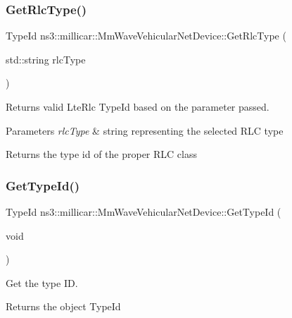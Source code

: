 \subsubsection{\texorpdfstring{Get\+Rlc\+Type()}{GetRlcType()}}
{\footnotesize\ttfamily Type\+Id ns3\+::millicar\+::\+Mm\+Wave\+Vehicular\+Net\+Device\+::\+Get\+Rlc\+Type (\begin{DoxyParamCaption}\item[{std\+::string}]{rlc\+Type }\end{DoxyParamCaption})}



Returns valid Lte\+Rlc Type\+Id based on the parameter passed. 


\begin{DoxyParams}{Parameters}
{\em rlc\+Type} & string representing the selected R\+LC type \\
\hline
\end{DoxyParams}
\begin{DoxyReturn}{Returns}
the type id of the proper R\+LC class 
\end{DoxyReturn}
\mbox{\label{classns3_1_1millicar_1_1MmWaveVehicularNetDevice_a5d96b39b9b59c2daa4068b6a302358fd}} 
\subsubsection{\texorpdfstring{Get\+Type\+Id()}{GetTypeId()}}
{\footnotesize\ttfamily Type\+Id ns3\+::millicar\+::\+Mm\+Wave\+Vehicular\+Net\+Device\+::\+Get\+Type\+Id (\begin{DoxyParamCaption}\item[{void}]{ }\end{DoxyParamCaption})\hspace{0.3cm}{\ttfamily [static]}}



Get the type ID. 

\begin{DoxyReturn}{Returns}
the object Type\+Id 
\end{DoxyReturn}
\mbox{\label{classns3_1_1millicar_1_1MmWaveVehicularNetDevice_a039f27547bec8a9eeea418b47241a578}} 
